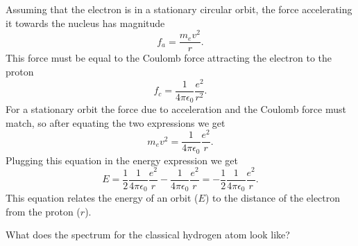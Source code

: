Assuming that the electron is in a stationary circular orbit, the force accelerating it towards the nucleus has magnitude
\begin{equation}
f_a = \frac{m_e v^2}{r}.
\end{equation}
This force must be equal to the Coulomb force attracting the electron to the proton
\begin{equation}
f_c =  \frac{1}{4 \pi \epsilon_0} \frac{e^2}{r^2}.
\end{equation}
For a stationary orbit the force due to acceleration and the Coulomb force must match, so after equating the two expressions we get
\begin{equation}
\label{eq:stationary_condition}
m_e v^2 = \frac{1}{4 \pi \epsilon_0} \frac{e^2}{r}.
\end{equation}
Plugging this equation in the energy expression we get
\begin{equation}
E = \frac{1}{2} \frac{1}{4 \pi \epsilon_0} \frac{e^2}{r} - \frac{1}{4 \pi \epsilon_0} \frac{e^2}{r}= - \frac{1}{2} \frac{1}{4 \pi \epsilon_0} \frac{e^2}{r}.
\end{equation}
This equation relates the energy of an orbit ($E$) to the distance of the electron from the proton ($r$).

\begin{exercise}
What does the spectrum for the classical hydrogen atom look like?
\end{exercise}


